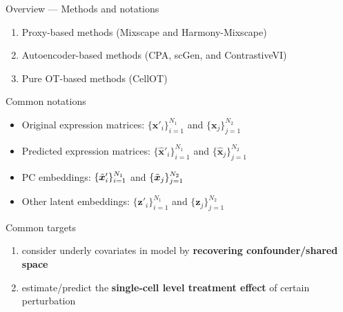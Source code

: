 \documentclass[10pt]{beamer}
\begin{document}
\begin{frame}{Overview --- \normalsize Methods and notations}
    \begin{enumerate}
        \item Proxy-based methods (Mixscape\cite{papalexi_characterizing_2021} and Harmony\cite{korsunsky_fast_2019}-Mixscape)
        \item Autoencoder-based methods (CPA\cite{lotfollahi_predicting_2023}, scGen\cite{lotfollahi_scgen_2019}, and ContrastiveVI\cite{weinberger_isolating_2023})
        \item Pure OT-based methods (CellOT\cite{bunne_learning_2023})
    \end{enumerate}
    \medskip
    Common notations
    \begin{itemize}\small
        \item Original expression matrices: $\{\bm{x}'_i\}_{i=1}^{N_1}$ and $\{\bm{x}_j\}_{j=1}^{N_2}$
        \item Predicted expression matrices: $\{\hat{\bm{x}}'_i\}_{i=1}^{N_1}$ and $\{\hat{\bm{x}}_j\}_{j=1}^{N_2}$
        \item PC embeddings: $\{\Tilde{\bm{x}}'_i\}_{i=1}^{N_1}$ and $\{\Tilde{\bm{x}}_j\}_{j=1}^{N_2}$
        \item Other latent embeddings: $\{\bm{z}'_i\}_{i=1}^{N_1}$ and $\{\bm{z}_j\}_{j=1}^{N_2}$
    \end{itemize}
    \medskip
    Common targets
    \begin{enumerate}\small
        \item consider underly covariates in model by \textbf{recovering confounder/shared space}
        \item estimate/predict the \textbf{single-cell level treatment effect} of certain perturbation
    \end{enumerate}

\end{frame}
\end{document}
